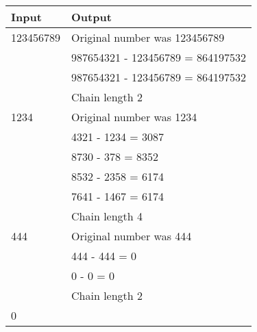 \documentclass{article}
\begin{document}
    \begin{table}[h] \Large
        \centering  
        \begin{tabular}{| p{8cm} | p{8cm} |}%
        \hline 
        \fontsize{18pt}{1pt}
        \Large Input&\Large Output
        \\ \hline  
        123456789 & Original number was 123456789 \\
         & 987654321 - 123456789 = 864197532\\
         & 987654321 - 123456789 = 864197532\\
        & Chain length 2\\
        \hline 
        1234 & Original number was 1234\\
        & 4321 - 1234 = 3087\\
        &8730 - 378 = 8352\\
        &8532 - 2358 = 6174\\
        &7641 - 1467 = 6174\\
        &Chain length 4 \\
        \hline
        444 & Original number was 444\\
        &444 - 444 = 0\\
        &0 - 0 = 0\\
        &Chain length 2\\
        \hline
        0 & \\
        \hline
        \end{tabular}
    \end{table}
\end{document}
